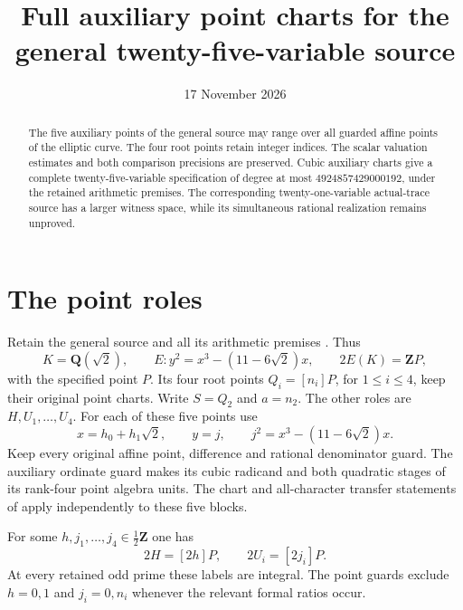\documentclass[11pt,a4paper]{article}
\title{Full auxiliary point charts for the general twenty-five-variable source}
\author{}\date{17 November 2026}
\newcommand{\Q}{\mathbf Q}\newcommand{\Z}{\mathbf Z}
\begin{document}
\maketitle
\begin{abstract}
The five auxiliary points of the general source may range over all
guarded affine points of the elliptic curve. The four root points
retain integer indices. The scalar valuation estimates and both
comparison precisions are preserved. Cubic auxiliary charts give a
complete twenty-five-variable specification of degree at most
$4924857429000192$, under the retained arithmetic premises. The
corresponding twenty-one-variable actual-trace source has a larger
witness space, while its simultaneous rational realization remains
unproved.
\end{abstract}

\section{The point roles}
Retain the general source and all its arithmetic premises
\cite{General,Unit,Terminal}. Thus
\[
 K=\Q(\sqrt2),\qquad E:y^2=x^3-(11-6\sqrt2)x,
 \qquad 2E(K)=\Z P,
\]
with the specified point $P$. Its four root points
$Q_i=[n_i]P$, for $1\le i\le4$, keep their original point charts.
Write $S=Q_2$ and $a=n_2$. The other roles are $H,U_1,\ldots,U_4$.
For each of these five points use
\[
 x=h_0+h_1\sqrt2,\qquad y=j,\qquad
 j^2=x^3-(11-6\sqrt2)x.
\]
Keep every original affine point, difference and rational denominator
guard. The auxiliary ordinate guard makes its cubic radicand and
both quadratic stages of its rank-four point algebra units.
The chart and all-character transfer statements of \cite{FullAux}
apply independently to these five blocks.

For some $h,j_1,\ldots,j_4\in\tfrac12\Z$ one has
\[
 2H=[2h]P,\qquad 2U_i=[2j_i]P.
\]
At every retained odd prime these labels are integral. The point
guards exclude $h=0,1$ and $j_i=0,n_i$ whenever the relevant
formal ratios occur.
\end{document}
